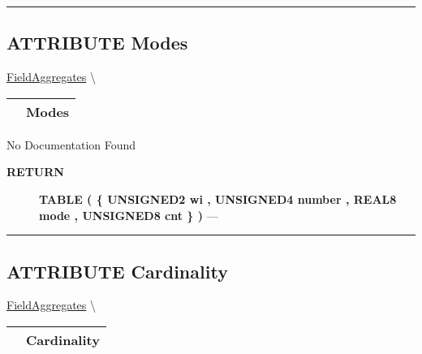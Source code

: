\rule{\linewidth}{0.5pt}
\subsection*{\textsf{\colorbox{headtoc}{\color{white} ATTRIBUTE}
Modes}}

\hypertarget{ecldoc:ml_core.fieldaggregates.modes}{}
\hspace{0pt} \hyperlink{ecldoc:ml_core.fieldaggregates}{FieldAggregates} \textbackslash 

{\renewcommand{\arraystretch}{1.5}
\begin{tabularx}{\textwidth}{|>{\raggedright\arraybackslash}l|X|}
\hline
\hspace{0pt}\mytexttt{\color{red} } & \textbf{Modes} \\
\hline
\end{tabularx}
}

\par





No Documentation Found








\par
\begin{description}
\item [\colorbox{tagtype}{\color{white} \textbf{\textsf{RETURN}}}] \textbf{TABLE ( \{ UNSIGNED2 wi , UNSIGNED4 number , REAL8 mode , UNSIGNED8 cnt \} )} --- 
\end{description}




\rule{\linewidth}{0.5pt}
\subsection*{\textsf{\colorbox{headtoc}{\color{white} ATTRIBUTE}
Cardinality}}

\hypertarget{ecldoc:ml_core.fieldaggregates.cardinality}{}
\hspace{0pt} \hyperlink{ecldoc:ml_core.fieldaggregates}{FieldAggregates} \textbackslash 

{\renewcommand{\arraystretch}{1.5}
\begin{tabularx}{\textwidth}{|>{\raggedright\arraybackslash}l|X|}
\hline
\hspace{0pt}\mytexttt{\color{red} } & \textbf{Cardinality} \\
\hline
\end{tabularx}
}

